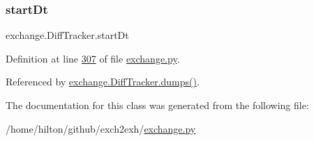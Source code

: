 \subsubsection{\texorpdfstring{start\+Dt}{startDt}}
{\footnotesize\ttfamily exchange.\+Diff\+Tracker.\+start\+Dt}



Definition at line \hyperlink{exchange_8py_source_l00307}{307} of file \hyperlink{exchange_8py_source}{exchange.\+py}.



Referenced by \hyperlink{exchange_8py_source_l00385}{exchange.\+Diff\+Tracker.\+dumps()}.



The documentation for this class was generated from the following file\+:\begin{DoxyCompactItemize}
\item 
/home/hilton/github/exch2exh/\hyperlink{exchange_8py}{exchange.\+py}\end{DoxyCompactItemize}
